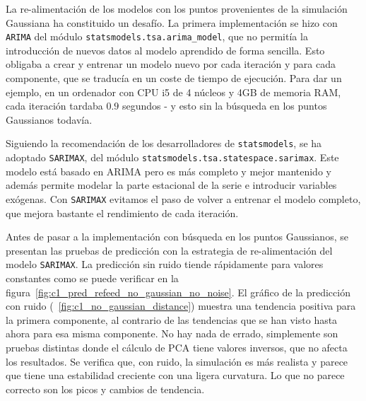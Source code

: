 \documentclass[11pt,spanish,listoffigures,listoftables]{tfgetsinf}
\begin{document}
	La re-alimentación de los modelos con los puntos provenientes de la simulación Gaussiana ha constituido un desafío. La primera implementación se hizo con {\tt ARIMA} del módulo {\tt statsmodels.tsa.arima\_model}, que no permitía la introducción de nuevos datos al modelo aprendido de forma sencilla. Esto obligaba a crear y entrenar un modelo nuevo por cada iteración y para cada componente, que se traducía en un coste de tiempo de ejecución. Para dar un ejemplo, en un ordenador con CPU i5 de 4 núcleos y 4GB de memoria RAM, cada iteración tardaba \(0.9\) segundos - y esto sin la búsqueda en los puntos Gaussianos todavía.
	
	Siguiendo la recomendación de los desarrolladores de {\tt statsmodels}, se ha adoptado {\tt SARIMAX}, del módulo {\tt statsmodels.tsa.statespace.sarimax}. Este modelo está basado en ARIMA pero es más completo y mejor mantenido y además permite modelar la parte estacional de la serie e introducir variables exógenas. Con {\tt SARIMAX} evitamos el paso de volver a entrenar el modelo completo, que mejora bastante el rendimiento de cada iteración.
	
	Antes de pasar a la implementación con búsqueda en los puntos Gaussianos, se presentan las pruebas de predicción con la estrategia de re-alimentación del modelo {\tt SARIMAX}. La predicción sin ruido tiende rápidamente para valores constantes como se puede verificar en la figura~\ref{fig:c1_pred_refeed_no_gaussian_no_noise}. El gráfico de la predicción con ruido (~\ref{fig:c1_no_gaussian_distance}) muestra una tendencia positiva para la primera componente, al contrario de las tendencias que se han visto hasta ahora para esa misma componente. No hay nada de errado, simplemente son pruebas distintas donde el cálculo de PCA tiene valores inversos, que no afecta los resultados. Se verifica que, con ruido, la simulación es más realista y parece que tiene una estabilidad creciente con una ligera curvatura. Lo que no parece correcto son los picos y cambios de tendencia.
	
\end{document}
